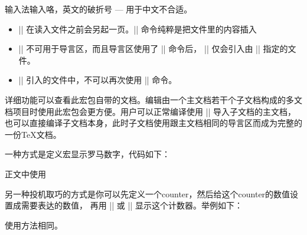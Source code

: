 
输入法输入咯，英文的破折号 --- 用于中文不合适。



\begin{itemize}
\item || 在读入文件之前会另起一页。|| 命令纯粹是把文件里的内容插入
\item || 不可用于导言区，而且导言区使用了 || 命令后，
  || 仅会引入由 || 指定的文件。
\item || 引入的文件中，不可以再次使用 || 命令。
\end{itemize}



详细功能可以查看此宏包自带的文档。编辑由一个主文档若干个子文档构成的多文档项目时使用此宏包会更方便。用户可以正常编译使用
|| 导入子文档的主文档，也可以直接编译子文档本身，此时子文档使用跟主文档相同的导言区而成为完整的一份\TeX{}文档。

















一种方式是定义宏显示罗马数字，代码如下：
\begin{texlist}
  \newcommand{\Myroman}[1]{\romannumeral #1}
  \newcommand{\MyRoman}[1]{\expandafter\@slowromancap\romannumeral #1@}
\end{texlist}
正文中使用
\begin{texlist}
   
\end{texlist}

另一种投机取巧的方式是你可以先定义一个counter，然后给这个counter的数值设置成需要表达的数值，
再用 |\Roman| 或 |\roman| 显示这个计数器。举例如下：
\begin{texlist}
  \newcommand{\MyRoman}[1]{\setcounter{romannum}{#1}\Roman{romannum}}
  \newcommand{\Myroman}[1]{\setcounter{romannum}{#1}\roman{romannum}}
\end{texlist}
使用方法相同。


